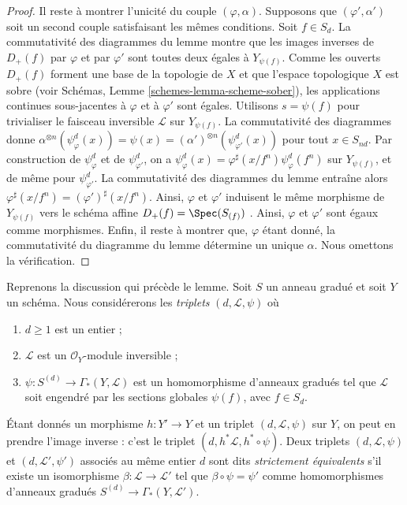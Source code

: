 \begin{proof}
\medskip\noindent
Il reste à montrer l'unicité du couple $(\varphi, \alpha)$. Supposons que
$(\varphi', \alpha')$ soit un second couple satisfaisant les mêmes conditions.
Soit $f \in S_d$. La commutativité des diagrammes du lemme montre que les
images inverses de $D_{+}(f)$ par $\varphi$ et par $\varphi'$ sont toutes deux
égales à $Y_{\psi(f)}$. Comme les ouverts $D_{+}(f)$ forment une base de la
topologie de $X$ et que l'espace topologique $X$ est sobre (voir Schémas,
Lemme \ref{schemes-lemma-scheme-sober}),
les applications continues sous-jacentes
à $\varphi$ et à $\varphi'$ sont égales. Utilisons $s = \psi(f)$ pour
trivialiser le faisceau inversible $\mathcal{L}$ sur $Y_{\psi(f)}$.
La commutativité des diagrammes donne
$\alpha^{\otimes n}(\psi^d_{\varphi}(x)) =
\psi(x) = (\alpha')^{\otimes n}(\psi^d_{\varphi'}(x))$
pour tout $x \in S_{nd}$. Par construction de $\psi^d_{\varphi}$ et de
$\psi^d_{\varphi'}$, on a
$\psi^d_{\varphi}(x) = \varphi^\sharp(x/f^n) \psi^d_{\varphi}(f^n)$
sur $Y_{\psi(f)}$, et de même pour $\psi^d_{\varphi'}$.
La commutativité des diagrammes du lemme entraîne alors
$\varphi^\sharp(x/f^n) = (\varphi')^\sharp(x/f^n)$.
Ainsi, $\varphi$ et $\varphi'$ induisent le même morphisme de
$Y_{\psi(f)}$ vers le schéma affine
$D_{+}(f) = \Spec(S_{(f)})$ . Ainsi, $\varphi$ et $\varphi'$
sont égaux comme morphismes. Enfin, il reste
à montrer que, $\varphi$ étant donné, la
commutativité du diagramme du lemme détermine un unique $\alpha$. Nous omettons
la vérification.
\end{proof}

\noindent
Reprenons la discussion qui précède le lemme. Soit $S$ un anneau gradué et
soit $Y$ un schéma. Nous considérerons les {\it triplets}
$(d, \mathcal{L}, \psi)$ où
\begin{enumerate}
\item $d \geq 1$ est un entier ;
\item $\mathcal{L}$ est un $\mathcal{O}_Y$-module inversible ;
\item $\psi : S^{(d)} \to \Gamma_*(Y, \mathcal{L})$ est un homomorphisme
d'anneaux gradués tel que $\mathcal{L}$ soit engendré par les sections
globales $\psi(f)$, avec $f \in S_d$.
\end{enumerate}
Étant donnés un morphisme $h : Y' \to Y$ et un triplet
$(d, \mathcal{L}, \psi)$ sur $Y$, on
peut en prendre l'image inverse : c'est
le triplet $(d, h^*\mathcal{L}, h^* \circ \psi)$.
Deux triplets $(d, \mathcal{L}, \psi)$ et
$(d, \mathcal{L}', \psi')$ associés au même entier $d$ sont dits
{\it strictement équivalents} s'il existe un isomorphisme
$\beta : \mathcal{L} \to \mathcal{L}'$ tel que
$\beta \circ \psi = \psi'$ comme homomorphismes d'anneaux gradués
$S^{(d)} \to \Gamma_*(Y, \mathcal{L}')$.

